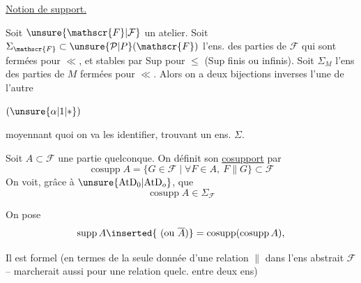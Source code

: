 
\uline{Notion de support.}

Soit $\unsure{\mathscr{F}|\mathcal{F}}$ un atelier. Soit $\Sigma_{\mathscr{F}}\subset\unsure{\mathcal{P}|P}(\mathscr{F})$ l'ens. des parties de $\mathscr{F}$ qui sont fermées  pour  $\ll$, et stables par Sup pour $\leq$ (Sup finis ou infinis). Soit $\Sigma_M$ l'ens des parties de $M$ fermées pour $\ll$. Alors on a deux bijections inverses l'une de l'autre

\noindent $(\unsure{\alpha|1|*})$

moyennant quoi on va les identifier, trouvant un ens. $\Sigma$.

Soit $A\subset\mathscr{F}$ une partie quelconque. On définit son \uline{cosupport} par
\[
\operatorname{cosupp}A=\{G\in\mathscr{F}\mid\forall F\in A,\ F\parallel G\}\subset\mathscr{F}
\]
On voit, grâce à $\unsure{\mathrm{AtD}_0|\mathrm{AtD}_o}$, que
\[
\operatorname{cosupp}A\in\Sigma_{\mathscr{F}}
\]


On  pose
\[
\operatorname{supp}A\inserted{\ (\text{ou }\overline A)}=\operatorname{cosupp}(\operatorname{cosupp}A),
\]


Il est formel (en termes de la seule donnée d'une relation $\parallel$ dans l'ens abstrait $\mathscr{F}$ --  marcherait aussi pour une relation quelc. entre deux ens)
